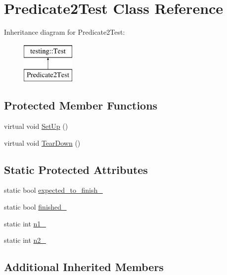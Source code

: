 \hypertarget{classPredicate2Test}{}\section{Predicate2\+Test Class Reference}
\label{classPredicate2Test}
Inheritance diagram for Predicate2\+Test\+:\begin{figure}[H]
\begin{center}
\leavevmode
\includegraphics[height=2.000000cm]{classPredicate2Test}
\end{center}
\end{figure}
\subsection*{Protected Member Functions}
\begin{DoxyCompactItemize}
\item 
virtual void \mbox{\hyperlink{classPredicate2Test_a9778563daf4846327d32061c1a8ccba0}{Set\+Up}} ()
\item 
virtual void \mbox{\hyperlink{classPredicate2Test_a7379f8f7772af6b4c76edcc90b6aaaeb}{Tear\+Down}} ()
\end{DoxyCompactItemize}
\subsection*{Static Protected Attributes}
\begin{DoxyCompactItemize}
\item 
static bool \mbox{\hyperlink{classPredicate2Test_a56cf1f0f556addd9a62e0644dc1a86fc}{expected\+\_\+to\+\_\+finish\+\_\+}}
\item 
static bool \mbox{\hyperlink{classPredicate2Test_a30f4ef76d3004253078e767e5c653b85}{finished\+\_\+}}
\item 
static int \mbox{\hyperlink{classPredicate2Test_ac002d8e279b24e75906fd19973fc2170}{n1\+\_\+}}
\item 
static int \mbox{\hyperlink{classPredicate2Test_a9dbe5173570b9b911af2df889c287027}{n2\+\_\+}}
\end{DoxyCompactItemize}
\subsection*{Additional Inherited Members}


